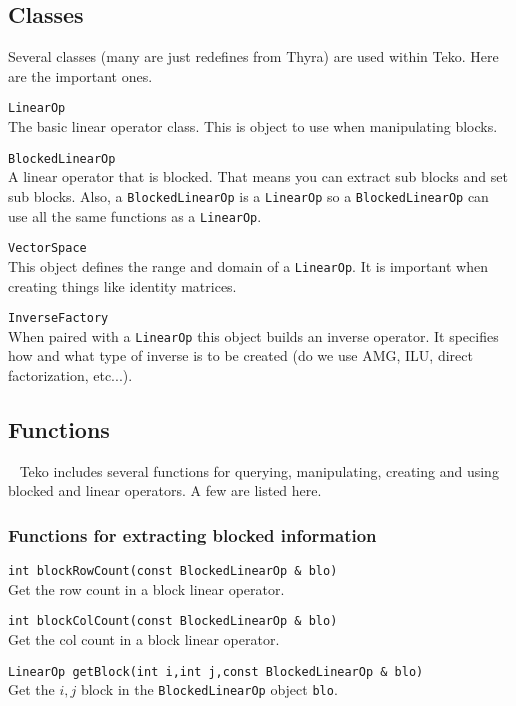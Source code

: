 \documentclass[12pt]{article}
\newcommand{\code}[1]{\lstinline[basicstyle=\footnotesize]!#1!}
\newcommand{\scode}[1]{\lstinline[basicstyle=\small\bfseries]!#1!}
\begin{document}
\subsection{Classes}\label{apx:classes}
Several classes (many are just redefines from Thyra) are used within Teko. Here
are the important ones.

\begin{framed}
\begin{flushleft}
\scode{LinearOp} \\
The basic linear operator class. This is object to use when manipulating blocks.

\vspace{10pt}
\scode{BlockedLinearOp} \\
A linear operator that is blocked. That means you can extract sub blocks and
set sub blocks. Also, a \verb!BlockedLinearOp! is a \verb!LinearOp! so a 
\verb!BlockedLinearOp! can use all the same functions as a \verb!LinearOp!.

\vspace{10pt}
\scode{VectorSpace} \\
This object defines the range and domain of a \verb!LinearOp!. It is important
when creating things like identity matrices.

\vspace{10pt}
\scode{InverseFactory} \\
When paired with a \code{LinearOp} this object builds an inverse operator. It specifies
how and what type of inverse is to be created (do we use AMG, ILU, direct factorization, etc...).

\end{flushleft}
\end{framed}

\subsection{Functions}~\label{apx:functions}
Teko includes several functions for querying, manipulating, creating and
using blocked and linear operators. A few are listed here.

\subsubsection{Functions for extracting blocked information}
\begin{framed}
\begin{flushleft}
\scode{int blockRowCount(const BlockedLinearOp & blo)} \\
Get the row count in a block linear operator.

\vspace{10pt}
\scode{int blockColCount(const BlockedLinearOp & blo)} \\
Get the col count in a block linear operator.

\vspace{10pt}
\scode{LinearOp getBlock(int i,int j,const BlockedLinearOp & blo)} \\
Get the $i,j$ block in the \code{BlockedLinearOp} object \code{blo}.
\end{flushleft}
\end{framed}
\end{document}
